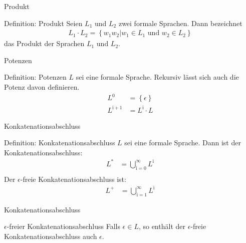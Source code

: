 \begin{frame}{Produkt}
    \begin{block}{Definition: Produkt}
        Seien $L_1$ und $L_2$ zwei formale Sprachen. Dann bezeichnet
        \begin{align*}
            L_1 \cdot L_2 = \left\{ w_1 w_2 | w_1 \in L_1 \text{\ und } w_2 \in L_2 \right\}
        \end{align*}
        das Produkt der Sprachen $L_1$ und $L_2$.
    \end{block}
\end{frame}
        
\begin{frame}{Potenzen}
    \begin{block}{Definition: Potenzen}
        $L$ sei eine formale Sprache. Rekursiv lässt sich auch die Potenz davon definieren.
        \begin{align*}
            L^0 &= \left\{ \epsilon\right\}\\
            L^\mathrm{i + 1} &= L^\mathrm{i} \cdot L
        \end{align*}
    \end{block}
\end{frame}
        
\begin{frame}{Konkatenationsabschluss}
    \begin{block}{Definition: Konkatenationsabschluss}
        $L$ sei eine formale Sprache. Dann ist der Konkatenationsabschluss:
        \begin{align*}
            L^* &= \bigcup_\mathrm{i = 0}^\infty L^\mathrm{i}\\
        \end{align*}
        Der $\epsilon$-freie Konkatenationsabschluss ist:
        \begin{align*}
            L^+ &= \bigcup_\mathrm{i = 1}^\infty L^\mathrm{i}
        \end{align*}
    \end{block}
\end{frame}

\begin{frame}{Konkatenationsabschluss}
    \begin{alertblock}{$\epsilon$-freier Konkatenationsabschluss}
        Falls $\epsilon \in L$, so enthält der $\epsilon$-freie Konkatenationsabschluss auch $\epsilon$.
    \end{alertblock}
\end{frame}

